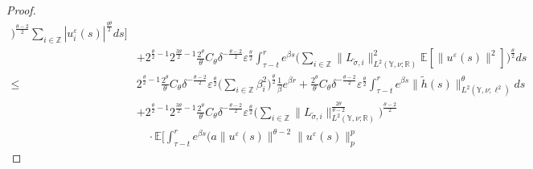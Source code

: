 \documentclass[11pt]{article}
\numberwithin{equation}{section}
\theoremstyle{plain}
\begin{document}
\begin{proof}
\begin{align}
                                             \Big)^{\frac{\theta -2}{2} } 
                                                           \sum_{i \in \mathbb{Z} }
                                                                  |u^{\varepsilon}_i(s) |^{\frac{q \theta} {2} }   
                                        ds
                                \bigg]  \nonumber\\
     & + 2^{\frac{\theta}{2} - 1} 2^{\frac{3\theta}{2} -1} 
                \frac{2^{\theta} }{\theta} C_{\theta} 
                \delta^{-\frac{\theta - 2}{2} } \varepsilon^{\frac{\theta}{2} }  
                    \int_{\tau-t}^{r} e^{\beta s}                                                                              
                         \Big( \sum_{i \in \mathbb{Z} } 
                                        \| L_{ \widetilde{\sigma}, i} \|_{L^2(\mathbb{Y}, \nu; \mathbb{R} ) }^2 
                                        \mathbb{E}\left[ \|u^{\varepsilon}(s)\|^2 \right]
                          \Big)^{\frac{\theta}{2} }                                             
                     ds  \nonumber\\      
\le & 2^{\frac{\theta}{2} -1} 
               \frac{2^{\theta} }{\theta} C_{\theta} 
               \delta^{-\frac{\theta - 2}{2} } \varepsilon^{\frac{\theta}{2} }
               \big( \sum_{i \in \mathbb{Z} } \beta_{i}^2
               \big)^{\frac{\theta}{2} }  
               \frac{1}{\beta} e^{\beta r} 
        + \frac{2^{\theta}}{\theta} C_{\theta} 
           \delta^{-\frac{\theta - 2}{2} } \varepsilon^{\frac{\theta}{2} }
 	             	         \int_{\tau-t}^{r} e^{\beta s}
 	                                   \| \widetilde{h}(s) \|_{L^2(\mathbb{Y}, \nu; \ell^2)}^\theta
 	                         ds  \nonumber\\
     & + 2^{\frac{\theta}{2} - 1} 2^{\frac{3\theta}{2} -1} 
                \frac{2^{\theta} }{\theta} C_{\theta} 
                \delta^{-\frac{\theta - 2}{2} } \varepsilon^{\frac{\theta}{2} }
                \Big( \sum_{i \in \mathbb{Z} } 
                              \| L_{ \widetilde{\sigma}, i} \|_{L^2(\mathbb{Y}, \nu; \mathbb{R} ) }^{\frac{2\theta}{\theta -2} } 
                \Big)^{\frac{\theta -2}{2} }  \nonumber\\
     & \quad 
                \cdot \mathbb{E}
               	                 \bigg[ \int_{\tau-t}^{r} e^{\beta s}       
                                                 \Big( a \|u^{\varepsilon}(s)\|^{\theta-2}   
                                                             \|u^{\varepsilon}(s)\|_p^{p} 

\end{align}
\end{proof}
\end{document}

